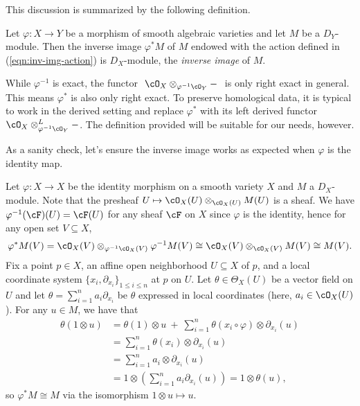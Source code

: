 This discussion is summarized by the following definition.
\begin{defn}\label{defn:inv-img}
	Let $\varphi:X\to Y$ be a morphism of smooth algebraic varieties and let $M$ be a $D_Y$-module. Then the inverse image $\varphi^*M$ of $M$ endowed with the action defined in (\ref{eqn:inv-img-action}) is $D_X$-module, the \emph{inverse image} of $M$.
\end{defn}
\begin{rmk}\label{rmk:derived-inverse-image}
	While $\varphi^{-1}$ is exact, the functor $~\cO_X\otimes_{\varphi^{-1}\cO_Y} - ~$ is only right exact in general. This means $\varphi^*$ is also only right exact. To preserve homological data, it is typical to work in the derived setting and replace $\varphi^*$ with its left derived functor $\cO_X\otimes_{\varphi^{-1}\cO_Y}^L -$. The definition provided will be suitable for our needs, however.
\end{rmk}
As a sanity check, let's ensure the inverse image works as expected when $\varphi$ is the identity map.
\begin{example}\label{example:pullback-sanity-check}
	Let $\varphi:X\to X$ be the identity morphism on a smooth variety $X$ and $M$ a $D_X$-module. Note that the presheaf $U\mapsto \cO_X(U)\otimes_{\cO_X(U)} M(U)$ is a sheaf. We have $\varphi^{-1}(\cF)(U) = \cF(U)$ for any sheaf $\cF$ on $X$ since $\varphi$ is the identity, hence for any open set $V \subseteq X$,
	\begin{align*}
		\varphi^*M(V) = \cO_X(V)\otimes_{\varphi^{-1}\cO_X(V)} \varphi^{-1}M(V) \cong \cO_X(V) \otimes_{\cO_X(V)} M(V) \cong M(V).
	\end{align*}
	Fix a point $p \in X$, an affine open neighborhood $U \subseteq X$ of $p$, and a local coordinate system $\{x_i,\partial_{x_i}\}_{1\leq i\leq n}$ at $p$ on $U$. Let $\theta \in \Theta_X(U)$ be a vector field on $U$ and let $\theta = \sum_{i=1}^n a_i\partial_{x_i}$ be $\theta$ expressed in local coordinates (here, $a_i \in \cO_X(U)$). For any $u \in M$, we have that
	\begin{align*}
		\theta(1\otimes u)
		&= \theta(1)\otimes u ~+~ \sum_{i=1}^n\theta(x_i\circ \varphi)\otimes \partial_{x_i}(u) \\
		&= \sum_{i=1}^n \theta(x_i)\otimes \partial_{x_i}(u) \\
		&= \sum_{i=1}^n a_i\otimes \partial_{x_i}(u) \\
		&= 1 \otimes \left(\sum_{i=1}^n a_i\partial_{x_i}(u)\right) = 1\otimes \theta(u),
	\end{align*}
	so $\varphi^*M \cong M$ via the isomorphism $1\otimes u\mapsto u$.
\end{example}
